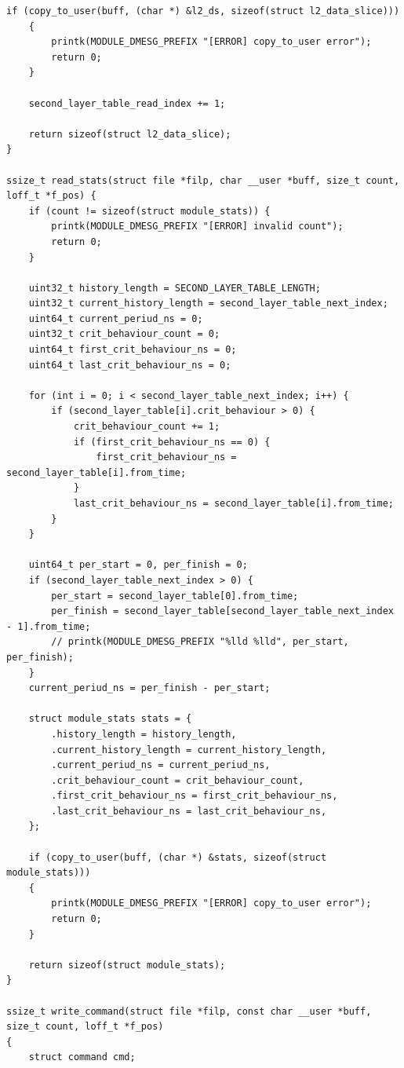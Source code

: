 \documentclass{bmstu}
\begin{document}
\begin{lstlisting}[caption = {core\_module.c}]
    if (copy_to_user(buff, (char *) &l2_ds, sizeof(struct l2_data_slice)))
    {
        printk(MODULE_DMESG_PREFIX "[ERROR] copy_to_user error");
        return 0;
    }

    second_layer_table_read_index += 1;

    return sizeof(struct l2_data_slice);
}

ssize_t read_stats(struct file *filp, char __user *buff, size_t count, loff_t *f_pos) {
    if (count != sizeof(struct module_stats)) {
        printk(MODULE_DMESG_PREFIX "[ERROR] invalid count");
        return 0;
    }

    uint32_t history_length = SECOND_LAYER_TABLE_LENGTH;
    uint32_t current_history_length = second_layer_table_next_index;
    uint64_t current_periud_ns = 0;
    uint32_t crit_behaviour_count = 0;
    uint64_t first_crit_behaviour_ns = 0;
    uint64_t last_crit_behaviour_ns = 0;

    for (int i = 0; i < second_layer_table_next_index; i++) {
        if (second_layer_table[i].crit_behaviour > 0) {
            crit_behaviour_count += 1;
            if (first_crit_behaviour_ns == 0) {
                first_crit_behaviour_ns = second_layer_table[i].from_time;
            }
            last_crit_behaviour_ns = second_layer_table[i].from_time;
        }
    }

    uint64_t per_start = 0, per_finish = 0;
    if (second_layer_table_next_index > 0) {
        per_start = second_layer_table[0].from_time;
        per_finish = second_layer_table[second_layer_table_next_index - 1].from_time;
        // printk(MODULE_DMESG_PREFIX "%lld %lld", per_start, per_finish);
    }
    current_periud_ns = per_finish - per_start;

    struct module_stats stats = {
        .history_length = history_length,
        .current_history_length = current_history_length,
        .current_periud_ns = current_periud_ns,
        .crit_behaviour_count = crit_behaviour_count,
        .first_crit_behaviour_ns = first_crit_behaviour_ns,
        .last_crit_behaviour_ns = last_crit_behaviour_ns,
    };

    if (copy_to_user(buff, (char *) &stats, sizeof(struct module_stats)))
    {
        printk(MODULE_DMESG_PREFIX "[ERROR] copy_to_user error");
        return 0;
    }

    return sizeof(struct module_stats);
}

ssize_t write_command(struct file *filp, const char __user *buff, size_t count, loff_t *f_pos) 
{
    struct command cmd;


\end{lstlisting}
\end{document}

